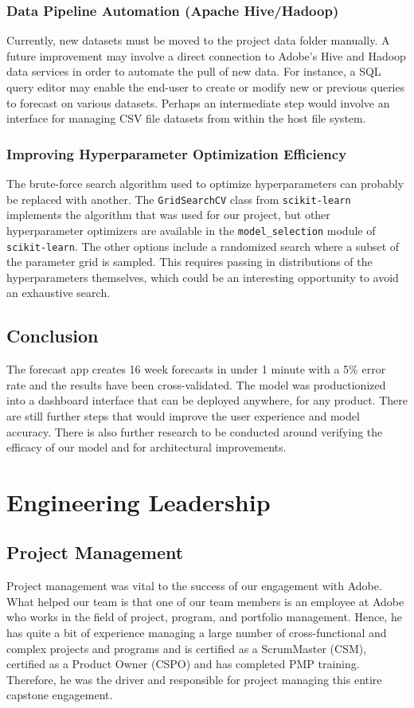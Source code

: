 \documentclass[11pt, oneside, authoryear]{report}
\begin{document}
\subsection{Data Pipeline Automation (Apache Hive/Hadoop)}
Currently, new datasets must be moved to the project data folder manually. A future improvement may involve a direct connection to Adobe's Hive and Hadoop data services in order to automate the pull of new data. For instance, a SQL query editor may enable the end-user to create or modify new or previous queries to forecast on various datasets. Perhaps an intermediate step would involve an interface for managing CSV file datasets from within the host file system.

\subsection{Improving Hyperparameter Optimization Efficiency}
\label{improving_hyperparameter_optimization_efficiency}
The brute-force search algorithm used to optimize hyperparameters can probably be replaced with another. The \texttt{GridSearchCV} class from \texttt{scikit-learn} implements the algorithm that was used for our project, but other hyperparameter optimizers are available in the \texttt{model\_selection} module of \texttt{scikit-learn}. The other options include a randomized search where a subset of the parameter grid is sampled. This requires passing in distributions of the hyperparameters themselves, which could be an interesting opportunity to avoid an exhaustive search.

\section{Conclusion}
The forecast app creates 16 week forecasts in under 1 minute with a 5\% error rate and the results have been cross-validated. The model was productionized into a dashboard interface that can be deployed anywhere, for any product. There are still further steps that would improve the user experience and model accuracy. There is also further research to be conducted around verifying the efficacy of our model and for architectural improvements.

\chapter{Engineering Leadership}

\section{Project Management}
Project management was vital to the success of our engagement with Adobe. What helped our team is that one of our team members is an employee at Adobe who works in the field of project, program, and portfolio management. Hence, he has quite a bit of experience managing a large number of cross-functional and complex projects and programs and is certified as a ScrumMaster (CSM), certified as a Product Owner (CSPO) and has completed PMP training. Therefore, he was the driver and responsible for project managing this entire capstone engagement.
\end{document}
